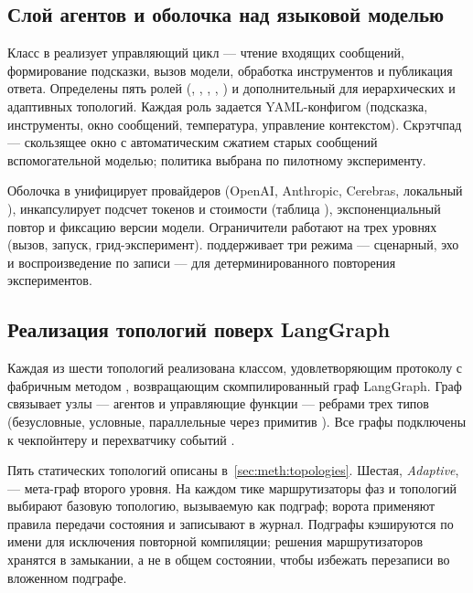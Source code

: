 \subsection{Слой агентов и оболочка над языковой моделью}
\label{sec:arch:agents}

Класс  в  реализует управляющий цикл ---
чтение входящих сообщений, формирование подсказки, вызов модели,
обработка инструментов и публикация ответа. Определены пять ролей
(, , , ,
) и дополнительный  для
иерархических и адаптивных топологий. Каждая роль задается
YAML-конфигом (подсказка, инструменты, окно сообщений, температура,
управление контекстом). Скрэтчпад --- скользящее окно с
автоматическим сжатием старых сообщений вспомогательной моделью;
политика выбрана по пилотному эксперименту.

Оболочка  в  унифицирует провайдеров
(OpenAI, Anthropic, Cerebras, локальный ),
инкапсулирует подсчет токенов и стоимости (таблица ),
экспоненциальный повтор и фиксацию версии модели. Ограничители
 работают на трех уровнях (вызов, запуск,
грид-эксперимент).  поддерживает три режима ---
сценарный, эхо и воспроизведение по записи --- для детерминированного
повторения экспериментов.

\subsection{Реализация топологий поверх LangGraph}
\label{sec:arch:topology}

Каждая из шести топологий реализована классом, удовлетворяющим
протоколу  с фабричным методом ,
возвращающим скомпилированный граф LangGraph. Граф связывает
узлы --- агентов и управляющие функции --- ребрами трех типов
(безусловные, условные, параллельные через примитив ).
Все графы подключены к чекпойнтеру и перехватчику событий
.

Пять статических топологий описаны в~\ref{sec:meth:topologies}.
Шестая, \emph{Adaptive}, --- мета-граф второго уровня. На каждом
тике маршрутизаторы фаз и топологий выбирают базовую топологию,
вызываемую как подграф; ворота  применяют
правила передачи состояния и записывают 
в журнал. Подграфы кэшируются по имени для исключения повторной
компиляции; решения маршрутизаторов хранятся в замыкании, а не
в общем состоянии, чтобы избежать перезаписи во вложенном подграфе.

